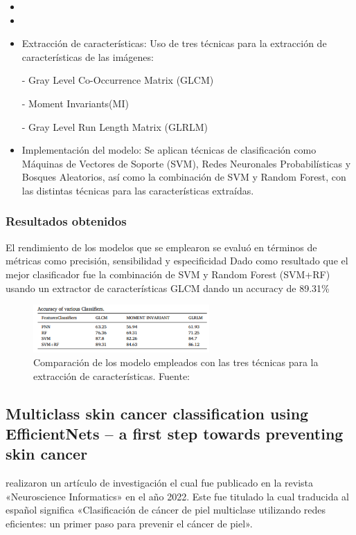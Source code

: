 \newcommand{\MEDSthree}{ Extracción de características: Uso de tres técnicas para la extracción de características de las imágenes: 
	
- Gray Level Co-Occurrence Matrix (GLCM)

- Moment Invariants(MI)

- Gray Level Run Length Matrix (GLRLM)

}
\newcommand{\MEDSfour}{Implementación del modelo: 
	Se aplican técnicas de clasificación como Máquinas de Vectores de Soporte (SVM), Redes Neuronales Probabilísticas y Bosques Aleatorios, así como la combinación de SVM y Random Forest, con las distintas técnicas para las características extraídas.
}


\begin{itemize}
	\item \MEDSone
	\item \MEDStwo
	\item \MEDSthree
	\item \MEDSfour
\end{itemize}


\subsubsection{Resultados obtenidos}
El rendimiento de los modelos que se emplearon se evaluó en términos de métricas como precisión, sensibilidad y especificidad
Dado como resultado que el mejor clasificador fue la combinación de SVM y Random Forest (SVM+RF) usando un extractor de características GLCM dando un accuracy de 89.31\% 
\begin{figure}[h]
	\begin{center}
		\includegraphics[width=0.6\textwidth]{2/figuras/Tecnica_Diagnosis_skin_cancer_imagen_01.png}
		\caption{Comparación de los modelo empleados con las  tres técnicas para la extracción de características. Fuente: \cite{murugan_2021diagnosis}}
		\label{1:fig}
	\end{center}
\end{figure}






\subsection{Multiclass skin cancer classification using EfficientNets – a first step towards preventing skin cancer \citep*{ali_2022multiclass}}
\citeauthor{ali_2022multiclass} realizaron un artículo de investigación el cual fue publicado en la revista «Neuroscience Informatics» en el año 2022. Este fue titulado  la cual traducida al español significa «Clasificación de cáncer de piel multiclase utilizando redes eficientes: un primer paso para prevenir el cáncer de piel».




